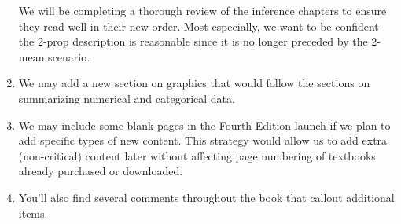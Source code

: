 \begin{enumerate}
    We will be completing a thorough review of the inference
    chapters to ensure they read well in their new order.
    Most especially, we want to be confident the 2-prop
    description is reasonable since it is no longer preceded
    by the 2-mean scenario.
\item
    We may add a new section on graphics
    that would follow the sections on summarizing numerical
    and categorical data.
\item
    We may include some blank pages in the Fourth Edition
    launch if we plan to add specific types of new content.
    This strategy would allow us to add extra (non-critical)
    content later without affecting page numbering of
    textbooks already purchased or downloaded.
\item
    You'll also find several comments throughout the book
    that callout additional items.
\end{enumerate}







